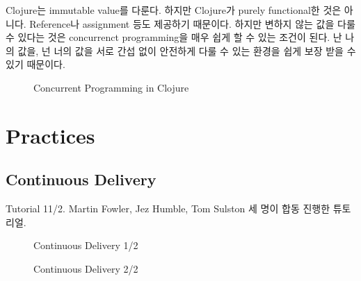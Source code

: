 \documentclass[11pt]{article}
\begin{document}
Clojure는 immutable value를 다룬다. 하지만  Clojure가 purely functional한 
것은 아니다. Reference나 assignment 등도 제공하기 때문이다. 
하지만 변하지 않는 값을 다룰 수 있다는 것은 concurrenct programming을 매우 
쉽게 할 수 있는 조건이 된다. 난 나의 값을, 넌 너의 값을 서로 간섭 없이 
안전하게 다룰 수 있는 환경을 쉽게 보장 받을 수 있기 때문이다.

% 
% 
% 

\begin{figure}[t]
    \begin{Frame}
        \begin{center}
        \end{center}
    \end{Frame}
    \caption{Concurrent Programming in Clojure}
    \label{clojure concurrent}
\end{figure}

\section{Practices}

\subsection{Continuous Delivery}
\label{sec:continuous delivery}

Tutorial 11/2.
Martin Fowler, Jez Humble, Tom Sulston 세 명이 합동 진행한 튜토리얼.

\begin{figure}[t]
    \begin{Frame}
        \begin{center}
        \end{center}
    \end{Frame}
    \caption{Continuous Delivery 1/2}
    \label{Continuous Delivery 1}
\end{figure}

\begin{figure}[t]
    \begin{Frame}
        \begin{center}
        \end{center}
    \end{Frame}
    \caption{Continuous Delivery 2/2}
    \label{Continuous Delivery 2}
\end{figure}
\end{document}
